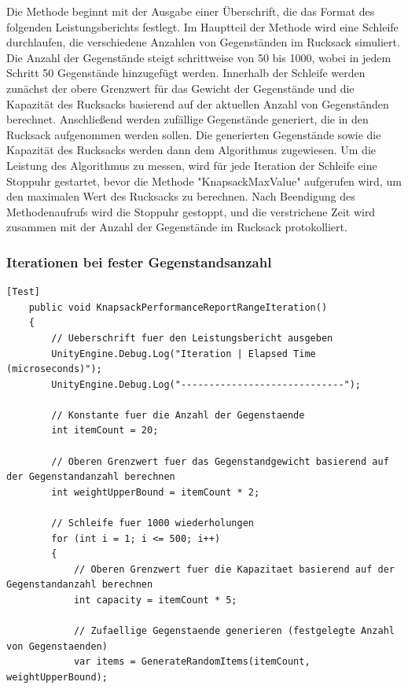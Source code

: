 \begin{itemize}
Die Methode beginnt mit der Ausgabe einer Überschrift, die das Format des folgenden Leistungsberichts festlegt. Im Hauptteil der Methode wird eine Schleife durchlaufen, die verschiedene Anzahlen von Gegenständen im Rucksack simuliert. Die Anzahl der Gegenstände steigt schrittweise von 50 bis 1000, wobei in jedem Schritt 50 Gegenstände hinzugefügt werden. Innerhalb der Schleife werden zunächst der obere Grenzwert für das Gewicht der Gegenstände und die Kapazität des Rucksacks basierend auf der aktuellen Anzahl von Gegenständen berechnet. Anschließend werden zufällige Gegenstände generiert, die in den Rucksack aufgenommen werden sollen. Die generierten Gegenstände sowie die Kapazität des Rucksacks werden dann dem Algorithmus zugewiesen.
Um die Leistung des Algorithmus zu messen, wird für jede Iteration der Schleife eine Stoppuhr gestartet, bevor die Methode "KnapsackMaxValue" aufgerufen wird, um den maximalen Wert des Rucksacks zu berechnen. Nach Beendigung des Methodenaufrufs wird die Stoppuhr gestoppt, und die verstrichene Zeit wird zusammen mit der Anzahl der Gegenstände im Rucksack protokolliert.

\subsubsection*{Iterationen bei fester Gegenstandsanzahl}

\begin{lstlisting}[style=csharp, caption={Codeabschnitt: Performance Messung bei 500 Aufrufen von 20 Gegenständen}, label={code:performanceIteration}]
    [Test]
    public void KnapsackPerformanceReportRangeIteration()
    {
        // Ueberschrift fuer den Leistungsbericht ausgeben
        UnityEngine.Debug.Log("Iteration | Elapsed Time (microseconds)");
        UnityEngine.Debug.Log("-----------------------------");

        // Konstante fuer die Anzahl der Gegenstaende
        int itemCount = 20;

        // Oberen Grenzwert fuer das Gegenstandgewicht basierend auf der Gegenstandanzahl berechnen
        int weightUpperBound = itemCount * 2;

        // Schleife fuer 1000 wiederholungen
        for (int i = 1; i <= 500; i++)
        {
            // Oberen Grenzwert fuer die Kapazitaet basierend auf der Gegenstandanzahl berechnen
            int capacity = itemCount * 5;

            // Zufaellige Gegenstaende generieren (festgelegte Anzahl von Gegenstaenden)
            var items = GenerateRandomItems(itemCount, weightUpperBound);


\end{lstlisting}
\end{itemize}
